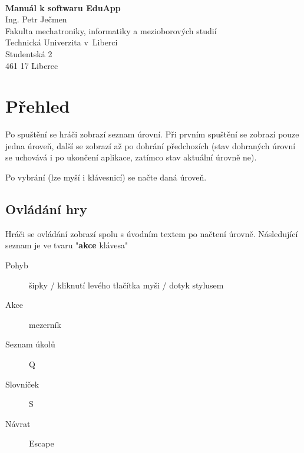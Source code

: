 \documentclass[a4paper,12pt]{article}
\date{September 13, 2013}
\begin{document}
\logo
\\\vspace{6pt}
\begin{center}
\large{\bfseries Manuál k softwaru EduApp}
\\\vspace{1pc}
\small{
Ing. Petr Ječmen
\\\vspace{1pc}
Fakulta mechatroniky, informatiky a mezioborových studií\\
Technická Univerzita v~Liberci\\
Studentská 2\\
461 17 Liberec}
\end{center}
\newpage
\section{Přehled}
Po spuštění se hráči zobrazí seznam úrovní. Při prvním spuštění se zobrazí pouze jedna úroveň, další se zobrazí až po dohrání předchozích (stav dohraných úrovní se uchovává i po ukončení aplikace, zatímco stav aktuální úrovně ne).
\begin{figure}[H]
\end{figure}
Po vybrání (lze myší i klávesnicí) se načte daná úroveň.
\subsection{Ovládání hry}
Hráči se ovládání zobrazí spolu s úvodním textem po načtení úrovně. Následující seznam je ve tvaru "\textbf{akce} klávesa"
\begin{description}
\item[Pohyb] šipky / kliknutí levého tlačítka myši / dotyk stylusem
\item[Akce] mezerník
\item[Seznam úkolů] Q
\item[Slovníček] S
\item[Návrat] Escape
\end{description}
\end{document}
